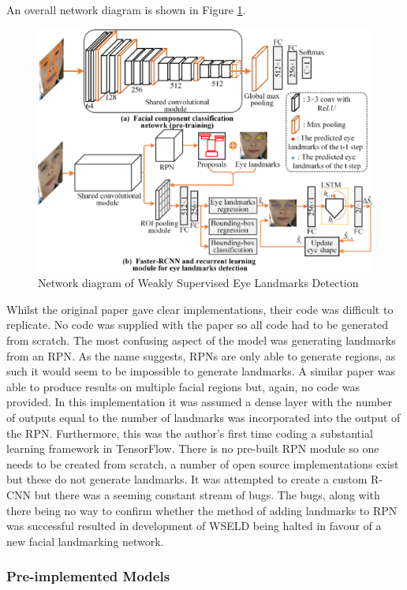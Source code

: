 An overall network diagram is shown in Figure \ref{fig:wseld}.

\begin{figure}[h]
    \centering
    \includegraphics[width=0.75\linewidth]{dissertation//figures/wseld.jpg}
    \caption{Network diagram of Weakly Supervised Eye Landmarks Detection\cite{huang2020eye}}
    \label{fig:wseld}
\end{figure}

Whilst the original paper gave clear implementations, their code was difficult to replicate. No code was supplied with the paper so all code had to be generated from scratch. The most confusing aspect of the model was generating landmarks from an RPN. As the name suggests, RPNs are only able to generate regions, as such it would seem to be impossible to generate landmarks. A similar paper was able to produce results on multiple facial regions\cite{tang2018facial} but, again, no code was provided. In this implementation it was assumed a dense layer with the number of outputs equal to the number of landmarks was incorporated into the output of the RPN. Furthermore, this was the author's first time coding a substantial learning framework in TensorFlow. There is no pre-built RPN module so one needs to be created from scratch, a number of open source implementations exist\cite{hxuaj2021tensorflow2}\cite{kewar2021region} but these do not generate landmarks. It was attempted to create a custom R-CNN but there was a seeming constant stream of bugs. The bugs, along with there being no way to confirm whether the method of adding landmarks to RPN was successful resulted in development of WSELD being halted in favour of a new facial landmarking network.

\subsubsection{Pre-implemented Models}

